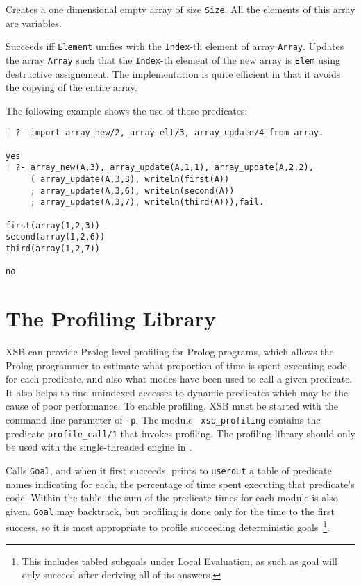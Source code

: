 \begin{description}
%
Creates a one dimensional empty array of size {\tt Size}.  All the
elements of this array are variables.  

  
%
Succeeds iff {\tt Element} unifies with the {\tt Index}-th element of
array {\tt Array}.  
%
  
%
Updates the array {\tt Array} such that the {\tt Index}-th element of
the new array is {\tt Elem} using destructive assignement.  The
implementation is quite efficient in that it avoids the copying of the
entire array.
\end{description}

The following example shows the use of these predicates:
{\footnotesize
\begin{verbatim}
| ?- import array_new/2, array_elt/3, array_update/4 from array.

yes
| ?- array_new(A,3), array_update(A,1,1), array_update(A,2,2),
     ( array_update(A,3,3), writeln(first(A))
     ; array_update(A,3,6), writeln(second(A))
     ; array_update(A,3,7), writeln(third(A))),fail.

first(array(1,2,3))
second(array(1,2,6))
third(array(1,2,7))

no
\end{verbatim}
}

\section{The Profiling Library} \label{sec:profile}

XSB can provide Prolog-level profiling for Prolog programs, which
allows the Prolog programmer to estimate what proportion of time is
spent executing code for each predicate, and also what modes have been
used to call a given predicate.  It also helps to find unindexed
accesses to dynamic predicates which may be the cause of poor
performance.  To enable profiling, XSB must be
started with the command line parameter of {\tt -p}.  The module {\tt
  xsb\_profiling} contains the predicate {\tt profile\_call/1} that
invokes profiling.  The profiling library should only be used with the
single-threaded engine in \version{}.

\begin{description}

Calls {\tt Goal}, and when it first succeeds, prints to {\tt userout}
a table of predicate names indicating for each, the percentage of time
spent executing that predicate's code.  Within the table, the sum of
the predicate times for each module is also given.  {\tt Goal} may
backtrack, but profiling is done only for the time to the first
success, so it is most appropriate to profile succeeding deterministic
goals~\footnote{This includes tabled subgoals under Local Evaluation,
  as such as goal will only succeed after deriving all of its
  answers.}.
\end{description}

